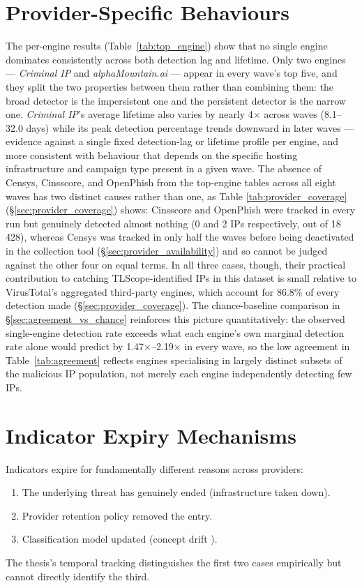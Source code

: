 \documentclass[12pt, a4paper, twoside]{report}
\begin{document}
\section{Provider-Specific Behaviours}

The per-engine results (Table~\ref{tab:top_engine}) show that no single engine dominates
consistently across both detection lag and lifetime. Only two engines --- \emph{Criminal IP} and
\emph{alphaMountain.ai} --- appear in every wave's top five, and they split the two properties
between them rather than combining them: the broad detector is the impersistent one and the
persistent detector is the narrow one. \emph{Criminal IP}'s average lifetime also varies by nearly
4$\times$ across waves (8.1--32.0 days) while its peak detection percentage trends downward in
later waves --- evidence against a single fixed detection-lag or lifetime profile per engine, and
more consistent with behaviour that depends on the specific hosting infrastructure and campaign
type present in a given wave. The absence of Censys, Cinsscore, and OpenPhish from the top-engine
tables across all eight waves has two distinct causes rather than one, as Table
\ref{tab:provider_coverage} (\S\ref{sec:provider_coverage}) shows: Cinsscore and OpenPhish were
tracked in every run but genuinely detected almost nothing (0 and 2 IPs respectively, out of
18\,428), whereas Censys was tracked in only half the waves before being deactivated in the
collection tool (\S\ref{sec:provider_availability}) and so cannot be judged against the other four
on equal terms. In all three cases, though, their practical contribution to catching
TLScope-identified IPs in this dataset is small relative to VirusTotal's aggregated third-party
engines, which account for 86.8\% of every detection made (\S\ref{sec:provider_coverage}). The
chance-baseline comparison in
\S\ref{sec:agreement_vs_chance} reinforces this picture quantitatively: the observed single-engine
detection rate exceeds what each engine's own marginal detection rate alone would predict by
1.47$\times$--2.19$\times$ in every wave, so the low agreement in Table~\ref{tab:agreement} reflects
engines specialising in largely distinct subsets of the malicious IP population, not merely each
engine independently detecting few IPs.

\section{Indicator Expiry Mechanisms}

Indicators expire for fundamentally different reasons across providers:
\begin{enumerate}
  \item The underlying threat has genuinely ended (infrastructure taken down).
  \item Provider retention policy removed the entry.
  \item Classification model updated (concept drift \cite{li2025conceptdrift}).
\end{enumerate}
The thesis's temporal tracking distinguishes the first two cases empirically but cannot directly
identify the third.
\end{document}
